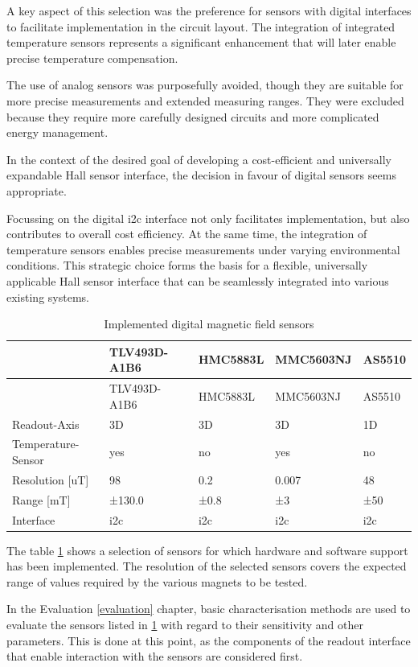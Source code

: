 A key aspect of this selection was the preference for sensors with
digital interfaces to facilitate implementation in the circuit layout.
The integration of integrated temperature sensors represents a
significant enhancement that will later enable precise temperature
compensation.

The use of analog sensors was purposefully avoided, though they are
suitable for more precise measurements and extended measuring ranges.
They were excluded because they require more carefully designed circuits
and more complicated energy management.

In the context of the desired goal of developing a cost-efficient and
universally expandable Hall sensor interface, the decision in favour of
digital sensors seems appropriate.

Focussing on the digital \gls{i2c} interface not only facilitates
implementation, but also contributes to overall cost efficiency. At the
same time, the integration of temperature sensors enables precise
measurements under varying environmental conditions. This strategic
choice forms the basis for a flexible, universally applicable Hall
sensor interface that can be seamlessly integrated into various existing
systems.

\begin{longtable}[]{@{}lllll@{}}
\caption{Implemented digital magnetic field sensors
\label{Implemented_digital_magnetic_field_sensors.csv}}\tabularnewline
\toprule
& TLV493D-A1B6 & HMC5883L & MMC5603NJ & AS5510\tabularnewline
\midrule
\endfirsthead
\toprule
& TLV493D-A1B6 & HMC5883L & MMC5603NJ & AS5510\tabularnewline
\midrule
\endhead
Readout-Axis & 3D & 3D & 3D & 1D\tabularnewline
Temperature-Sensor & yes & no & yes & no\tabularnewline
Resolution {[}uT{]} & 98 & 0.2 & 0.007 & 48\tabularnewline
Range {[}mT{]} & ±130.0 & ±0.8 & ±3 & ±50\tabularnewline
Interface & \gls{i2c} & \gls{i2c} & \gls{i2c} & \gls{i2c}\tabularnewline
\bottomrule
\end{longtable}

The table \ref{Implemented_digital_magnetic_field_sensors.csv} shows a
selection of sensors for which hardware and software support has been
implemented. The resolution of the selected sensors covers the expected
range of values required by the various magnets to be tested.

In the Evaluation \ref{evaluation} chapter, basic characterisation
methods are used to evaluate the sensors listed in
\ref{Implemented_digital_magnetic_field_sensors.csv} with regard to
their sensitivity and other parameters. This is done at this point, as
the components of the readout interface that enable interaction with the
sensors are considered first.

